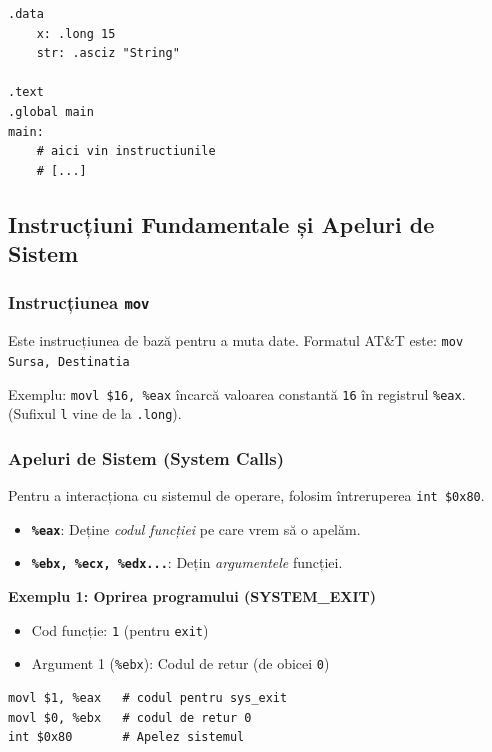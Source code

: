 \documentclass[12pt,a4paper]{article}
\begin{document}
\begin{lstlisting}[language=x86asm]
.data
    x: .long 15
    str: .asciz "String"

.text
.global main
main:
    # aici vin instructiunile
    # [...]
\end{lstlisting}

\subsection{Instrucțiuni Fundamentale și Apeluri de Sistem}

\subsubsection{Instrucțiunea \texttt{mov}}
Este instrucțiunea de bază pentru a muta date. Formatul AT\&T este:
\texttt{mov Sursa, Destinatia}

Exemplu: \texttt{movl \$16, \%eax} încarcă valoarea constantă \texttt{16} în registrul \texttt{\%eax}. (Sufixul \texttt{l} vine de la \texttt{.long}).

\subsubsection{Apeluri de Sistem (System Calls)}
Pentru a interacționa cu sistemul de operare, folosim întreruperea \texttt{int \$0x80}.
\begin{itemize}
    \item \textbf{\texttt{\%eax}}: Deține \textit{codul funcției} pe care vrem să o apelăm.
    \item \textbf{\texttt{\%ebx, \%ecx, \%edx...}}: Dețin \textit{argumentele} funcției.
\end{itemize}

\textbf{Exemplu 1: Oprirea programului (SYSTEM\_EXIT)}
\begin{itemize}
    \item Cod funcție: \texttt{1} (pentru \texttt{exit})
    \item Argument 1 (\texttt{\%ebx}): Codul de retur (de obicei \texttt{0})
\end{itemize}
\begin{lstlisting}[language=x86asm]
movl $1, %eax   # codul pentru sys_exit
movl $0, %ebx   # codul de retur 0
int $0x80       # Apelez sistemul
\end{lstlisting}
\end{document}
